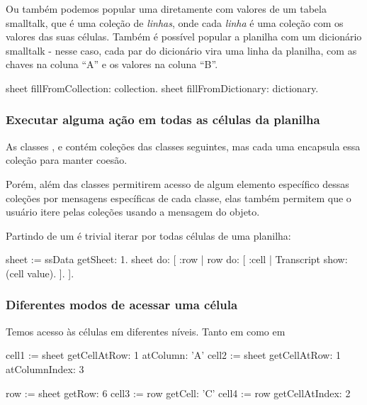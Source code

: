 {Ou também podemos popular uma  diretamente com valores de um tabela
smalltalk, que é uma coleção de \textit{linhas}, onde cada \textit{linha} é uma coleção
com os valores das suas células. Também é possível popular a planilha com um dicionário
smalltalk - nesse caso, cada par  do dicionário vira uma linha
da planilha, com as chaves na coluna ``A'' e os valores na coluna ``B''.
\begin{godSS}[moreemph={fillFromCollection:,fillFromDictionary:}]
sheet fillFromCollection: collection.
sheet fillFromDictionary: dictionary.
\end{godSS}

\subsubsection{Executar alguma ação em todas as células da planilha}
As classes ,  e  contém
coleções das classes seguintes, mas cada uma encapsula essa coleção para manter coesão.

Porém, além das classes permitirem acesso de algum elemento específico dessas coleções
por mensagens específicas de cada classe, elas também permitem que o usuário
itere pelas coleções usando a mensagem  do objeto.

Partindo de um  é trivial iterar por todas células de uma planilha:
\begin{godSS}[moreemph={getSheet:,do:,show:}]
sheet := ssData getSheet: 1.
sheet do: [ :row |
  row do: [ :cell |
    Transcript show: (cell value).
    ].
  ].
\end{godSS}


\subsubsection{Diferentes modos de acessar uma célula}
Temos acesso às células em diferentes níveis. Tanto em  como em 

\begin{godSS}[moreemph={getCellAtRow:, atColumn:, atColumnIndex:, getCell:, getCellAtIndex:, getRow:}]
cell1 := sheet getCellAtRow: 1 atColumn: 'A'
cell2 := sheet getCellAtRow: 1 atColumnIndex: 3

row := sheet getRow: 6
cell3 := row getCell: 'C'
cell4 := row getCellAtIndex: 2
\end{godSS}


}